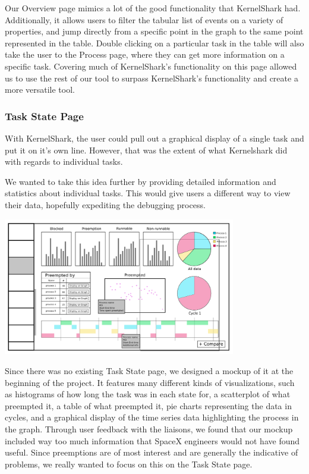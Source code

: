 \documentclass{hmcclinic}
\begin{document}
Our Overview page mimics a lot of the good
functionality that KernelShark had. Additionally, it allows users to filter the
tabular list of events on a variety of properties, and jump directly from a
specific point in the graph to the same point represented in the table. Double
clicking on a particular task in the table will also take the user to the
Process page, where they can get more information on a specific task. Covering
much of KernelShark's functionality on this page allowed us to use the rest of
our tool to surpass KernelShark's functionality and create a more versatile
tool.

\subsubsection{Task State Page}

With KernelShark, the user could pull out a graphical display of a single
task and put it on it's own line. However, that was the extent of what
Kernelshark did with regards to individual tasks.

We wanted to take this idea further by providing detailed information and
statistics about individual tasks. This would give users a different way to view
their data, hopefully expediting the debugging process.

\begin{center}
\includegraphics[width=4in]{perProcess-49.png}
\end{center}

Since there was no existing Task State page, we designed a mockup of it at the
beginning of the project. It features many different kinds of visualizations,
such as histograms of how long the task was in each state for, a scatterplot of 
what preempted it, a table of what preempted it, pie charts representing the 
data in cycles, and a graphical display of the time series data highlighting 
the process in the graph. Through user feedback with the liaisons, we found 
that our mockup included way too much information that SpaceX engineers would 
not have found useful. Since preemptions are of most interest and are generally
the indicative of problems, we really wanted to focus on this on the Task State
page.
\end{document}
